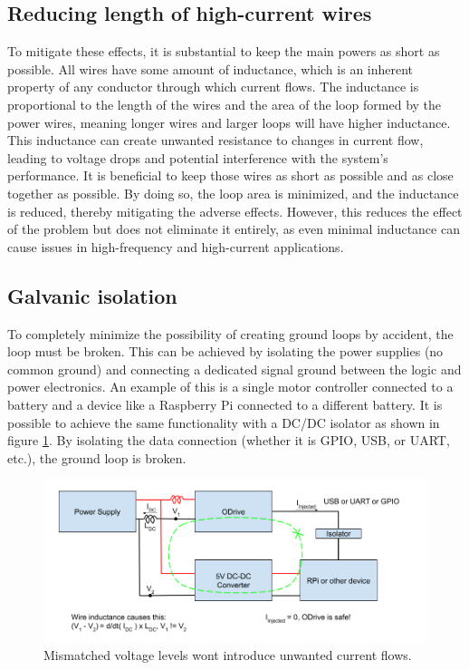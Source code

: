     \clearpage
    \subsection{Reducing length of high-current wires}
    
    To mitigate these effects, it is substantial to keep the main powers as short as possible. All wires have some amount of inductance, which is an inherent property of any conductor through which current flows. The inductance is proportional to the length of the wires and the area of the loop formed by the power wires, meaning longer wires and larger loops will have higher inductance. This inductance can create unwanted resistance to changes in current flow, leading to voltage drops and potential interference with the system's performance. It is beneficial to keep those wires as short as possible and as close together as possible. By doing so, the loop area is minimized, and the inductance is reduced, thereby mitigating the adverse effects. However, this reduces the effect of the problem but does not eliminate it entirely, as even minimal inductance can cause issues in high-frequency and high-current applications.
    
    \subsection{Galvanic isolation}
    
    To completely minimize the possibility of creating ground loops by accident, the loop must be broken. This can be achieved by isolating the power supplies (no common ground) and connecting a dedicated signal ground between the logic and power electronics. An example of this is a single motor controller connected to a battery and a device like a Raspberry Pi connected to a different battery. It is possible to achieve the same functionality with a DC/DC isolator as shown in figure \ref{ground_loop_fix}. By isolating the data connection (whether it is GPIO, USB, or UART, etc.), the ground loop is broken.
    
    \begin{figure}[h]
    \includegraphics[width=\textwidth]{contents/figures/ground_loop_fix.png}
    \caption{Mismatched voltage levels wont introduce unwanted current flows.}
    \label{ground_loop_fix}
    \end{figure}

